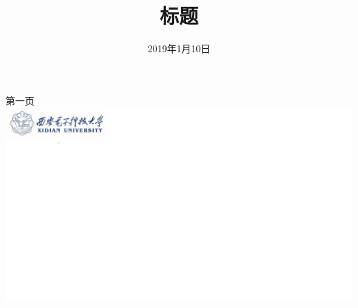 \documentclass{beamer}
\begin{document}
\title[]{标题}           %
\date{2019年1月10日}
\begin{frame}[plain]          %
\titlepage                      
\end{frame}

\begin{frame}
第一页
\includegraphics[scale=0.4]{xd.jpg} 
\end{frame}
\end{document}

